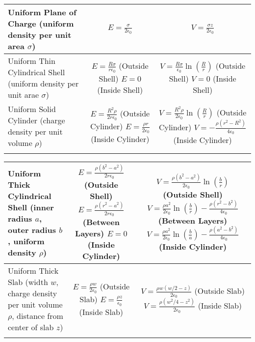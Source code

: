 \begin{center}
\begin{tabular}{m{4cm} c c}
		\centering Uniform Plane of Charge (uniform density per unit area $\sigma$)&  $E = \frac{\sigma}{2\epsilon_0}$&$V = \frac{\sigma z}{2\epsilon_0}$\\[3pt]  \hline \noalign{\smallskip}
		\centering Uniform Thin Cylindrical Shell (uniform density per unit arae $\sigma$) & \makecell{$E = \frac{R\sigma}{r\epsilon_0}$ (Outside Shell)\\$E = 0$ (Inside Shell)}& \makecell{$V = \frac{R\sigma}{\epsilon_0}\ln\left(\frac{R}{r}\right)$ (Outside Shell) \\ $V = 0$ (Inside Shell)}\\[3pt]  \hline \noalign{\smallskip}
		\centering Uniform Solid Cylinder (charge density per unit volume $\rho$)& \makecell{$E = \frac{R^2\rho}{2 r\epsilon_0}$ (Outside Cylinder)\\$E = \frac{\rho r}{2 \epsilon_0}$ (Inside Cylinder)} & \makecell{$V=\frac{R^2\rho}{2\epsilon_0}\ln\left(\frac{R}{r}\right)$ (Outside Cylinder)\\ $V = -\frac{\rho (r^2-R^2)}{4 \epsilon_0}$ (Inside Cylinder)}\\[3pt]  \hline \noalign{\smallskip}
	\end{tabular}
\end{center}
\begin{center}
	\begin{tabular}{m{4cm} c c}
	\hline \noalign{\smallskip}
		\centering Uniform Thick Cylindrical Shell (inner radius $a$, outer radius $b$, uniform density $\rho$)& \makecell{$E = \frac{\rho (b^2-a^2)}{2r\epsilon_0}$ (Outside Shell) \\ $E = \frac{\rho (r^2-a^2)}{2r\epsilon_0}$ (Between Layers) \\ $E = 0$ (Inside Cylinder)} &\makecell{$V = \frac{\rho (b^2-a^2)}{2\epsilon_0}\ln\left(\frac{b}{r}\right)$ (Outside Shell) \\ $V = \frac{\rho a^2}{2\epsilon_0}\ln\left(\frac{b}{r}\right) -\frac{\rho (r^2-b^2)}{4\epsilon_0}$ (Between Layers) \\ $V = \frac{\rho a^2}{2\epsilon_0}\ln\left(\frac{b}{a}\right) -\frac{\rho (a^2-b^2)}{4\epsilon_0}$ (Inside Cylinder)}\\[3pt]  \hline \noalign{\smallskip}
		\centering Uniform Thick Slab (width $w$, charge density per unit volume $\rho$, distance from center of slab $z$)& \makecell{$E = \frac{\rho w}{2 \epsilon_0}$ (Outside Slab) \\ $E = \frac{\rho z}{\epsilon_0}$ (Inside Slab)} & \makecell{$V = \frac{\rho w(w/2 - z)}{2 \epsilon_0}$ (Outside Slab) \\ $V = \frac{\rho (w^2/4 - z^2)}{2\epsilon_0}$ (Inside Slab)} \\[3pt]  \hline \hline \noalign{\smallskip}
	\end{tabular}
\end{center}
